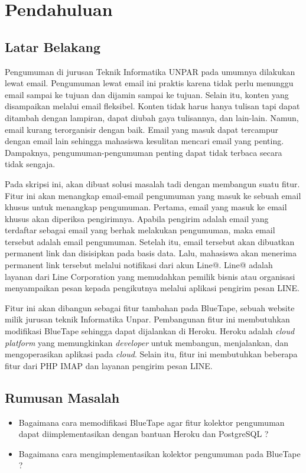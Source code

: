 \chapter{Pendahuluan}
\label{chap:pendahuluan}
   
\section{Latar Belakang}
\label{sec:latarBelakang}
Pengumuman di jurusan Teknik Informatika UNPAR pada umumnya dilakukan lewat email. Pengumuman lewat email ini praktis karena tidak perlu menunggu email sampai ke tujuan dan dijamin sampai ke tujuan. Selain itu, konten yang disampaikan melalui email fleksibel. Konten tidak harus hanya tulisan tapi dapat ditambah dengan lampiran, dapat diubah gaya tulisannya, dan lain-lain. Namun, email kurang terorganisir dengan baik. Email yang masuk dapat tercampur dengan email lain sehingga mahasiswa kesulitan mencari email yang penting. Dampaknya, pengumuman-pengumuman penting dapat tidak terbaca secara tidak sengaja.

Pada skripsi ini, akan dibuat solusi masalah tadi dengan membangun suatu fitur. Fitur ini akan menangkap email-email pengumuman yang masuk ke sebuah email khusus untuk menangkap pengumuman. Pertama, email yang masuk ke email khusus akan diperiksa pengirimnya. Apabila pengirim adalah email yang terdaftar sebagai email yang berhak melakukan pengumuman, maka email tersebut adalah email pengumuman. Setelah itu, email tersebut akan dibuatkan permanent link dan disisipkan pada basis data. Lalu, mahasiswa akan menerima permanent link tersebut melalui notifikasi dari akun Line@. Line@ adalah layanan dari Line Corporation yang memudahkan pemilik bisnis atau organisasi menyampaikan pesan kepada pengikutnya melalui aplikasi pengirim pesan LINE.

Fitur ini akan dibangun sebagai fitur tambahan pada BlueTape, sebuah website milik jurusan teknik Informatika Unpar. Pembangunan fitur ini membutuhkan modifikasi BlueTape sehingga dapat dijalankan di Heroku. Heroku adalah \textit{cloud platform} yang memungkinkan \textit{developer} untuk membangun, menjalankan, dan mengoperasikan aplikasi pada \textit{cloud}. Selain itu, fitur ini membutuhkan beberapa fitur dari PHP IMAP dan layanan pengirim pesan LINE.

\section{Rumusan Masalah}
\label{sec:rumusanmasalah}
\begin{itemize}
\item Bagaimana cara memodifikasi BlueTape agar fitur kolektor pengumuman dapat diimplementasikan dengan bantuan Heroku dan PostgreSQL ?
\item Bagaimana cara mengimplementasikan kolektor pengumuman pada BlueTape ?
\end{itemize}

